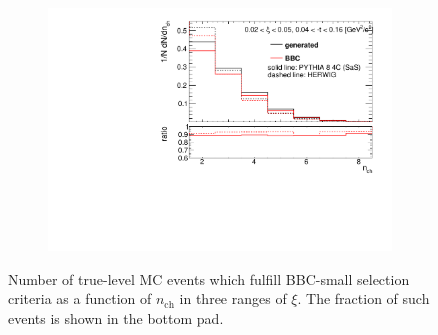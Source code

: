 \begin{figure}[h!]
\begin{subfigure}{.45\textwidth}
		\includegraphics[width=\textwidth,page=3]{chapters/chrgSTAR/img/bbcCorrection/xi_bbc.pdf}
	\end{subfigure}
	\begin{minipage}{.45\textwidth}
		\caption{Number of true-level MC events which fulfill BBC-small selection criteria  as a function of $n_\textrm{ch}$ in three ranges of $\xi$. The fraction of such events is shown in the bottom pad.}
		\label{fig:bbcCorection_nch}
	\end{minipage}
\end{figure}
